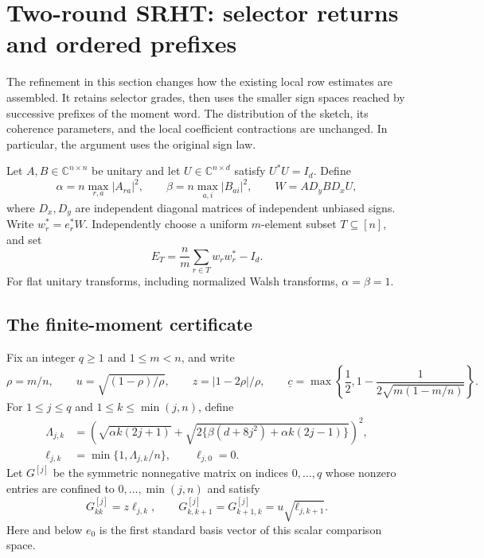 \documentclass[11pt,a4paper]{article}
\theoremstyle{definition}\newtheorem{definition}[theorem]{Definition}
\theoremstyle{remark}\newtheorem{remark}[theorem]{Remark}
\newcommand{\E}{\mathbb E}\newcommand{\Prob}{\mathbb P}
\newcommand{\Tr}{\operatorname{Tr}}\newcommand{\tr}{\operatorname{Tr}}
\newcommand{\norm}[1]{\lVert#1\rVert}\newcommand{\ip}[2]{\langle#1,#2\rangle}
\numberwithin{equation}{section}
\begin{document}
\section{Two-round SRHT: selector returns and ordered prefixes}
\label{sec:srht-prefix}

The refinement in this section changes how the existing local row estimates
are assembled. It retains selector grades, then uses the smaller sign spaces
reached by successive prefixes of the moment word. The distribution of the
sketch, its coherence parameters, and the local coefficient contractions are
unchanged. In particular, the argument uses the original sign law.

Let $A,B\in\mathbb C^{n\times n}$ be unitary and let
$U\in\mathbb C^{n\times d}$ satisfy $U^*U=I_d$. Define
\[
 \alpha=n\max_{r,a}|A_{ra}|^2,\qquad
 \beta=n\max_{a,i}|B_{ai}|^2,\qquad
 W=AD_yBD_xU,
\]
where $D_x,D_y$ are independent diagonal matrices of independent unbiased
signs. Write $w_r^*=e_r^*W$. Independently choose a uniform $m$-element
subset $T\subseteq[n]$, and set
\begin{equation}
 E_T=\frac nm\sum_{r\in T}w_rw_r^*-I_d.
 \label{eq:srht-error}
\end{equation}
For flat unitary transforms, including normalized Walsh transforms,
$\alpha=\beta=1$.

\subsection{The finite-moment certificate}

Fix an integer $q\ge1$ and $1\le m<n$, and write
\[
 \rho=m/n,\qquad u=\sqrt{(1-\rho)/\rho},\qquad
 z=|1-2\rho|/\rho,
 \qquad
 \underline c=\max\left\{\frac12,
       1-\frac1{2\sqrt{m(1-m/n)}}\right\}.
\]
For $1\le j\le q$ and $1\le k\le\min(j,n)$, define
\begin{align}
 \Lambda_{j,k}
 &=\left(\sqrt{\alpha k(2j+1)}
      +\sqrt{2\{\beta(d+8j^2)+\alpha k(2j-1)\}}\right)^2,
       \label{eq:srht-Lambda}\\
 \ell_{j,k}&=\min\{1,\Lambda_{j,k}/n\},\qquad \ell_{j,0}=0.
       \label{eq:srht-ell}
\end{align}
Let $G^{[j]}$ be the symmetric nonnegative matrix on indices $0,\ldots,q$
whose nonzero entries are confined to $0,\ldots,\min(j,n)$ and satisfy
\begin{equation}
 G^{[j]}_{kk}=z\ell_{j,k},\qquad
 G^{[j]}_{k,k+1}=G^{[j]}_{k+1,k}=u\sqrt{\ell_{j,k+1}}.
 \label{eq:srht-stage-matrix}
\end{equation}
Here and below $e_0$ is the first standard basis vector of this scalar
comparison space.
\end{document}
